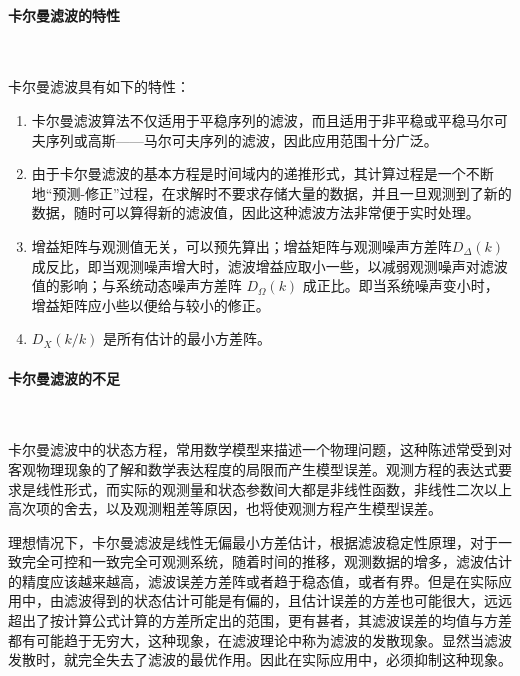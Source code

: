 \paragraph{卡尔曼滤波的特性}~{}


    卡尔曼滤波具有如下的特性：
    \begin{enumerate}[(1)]
        \item 卡尔曼滤波算法不仅适用于平稳序列的滤波，而且适用于非平稳或平稳马尔可夫序列或高斯——马尔可夫序列的滤波，因此应用范围十分广泛。 
        \item 由于卡尔曼滤波的基本方程是时间域内的递推形式，其计算过程是一个不断地“预测-修正”过程，在求解时不要求存储大量的数据，并且一旦观测到了新的数据，随时可以算得新的滤波值，因此这种滤波方法非常便于实时处理。
        \item 增益矩阵与观测值无关，可以预先算出；增益矩阵与观测噪声方差阵$D_{\Delta}(k)$ 成反比，即当观测噪声增大时，滤波增益应取小一些，以减弱观测噪声对滤波值的影响；与系统动态噪声方差阵 $D_{\Omega}(k)$ 成正比。即当系统噪声变小时，增益矩阵应小些以便给与较小的修正。
        \item $D_{X}(k / k)$  是所有估计的最小方差阵。
    \end{enumerate}


\paragraph{卡尔曼滤波的不足}~{}

        卡尔曼滤波中的状态方程，常用数学模型来描述一个物理问题，这种陈述常受到对客观物理现象的了解和数学表达程度的局限而产生模型误差。观测方程的表达式要求是线性形式，而实际的观测量和状态参数间大都是非线性函数，非线性二次以上高次项的舍去，以及观测粗差等原因，也将使观测方程产生模型误差。
        
        理想情况下，卡尔曼滤波是线性无偏最小方差估计，根据滤波稳定性原理，对于一致完全可控和一致完全可观测系统，随着时间的推移，观测数据的增多，滤波估计的精度应该越来越高，滤波误差方差阵或者趋于稳态值，或者有界。但是在实际应用中，由滤波得到的状态估计可能是有偏的，且估计误差的方差也可能很大，远远超出了按计算公式计算的方差所定出的范围，更有甚者，其滤波误差的均值与方差都有可能趋于无穷大，这种现象，在滤波理论中称为滤波的发散现象。显然当滤波发散时，就完全失去了滤波的最优作用。因此在实际应用中，必须抑制这种现象。 
        
